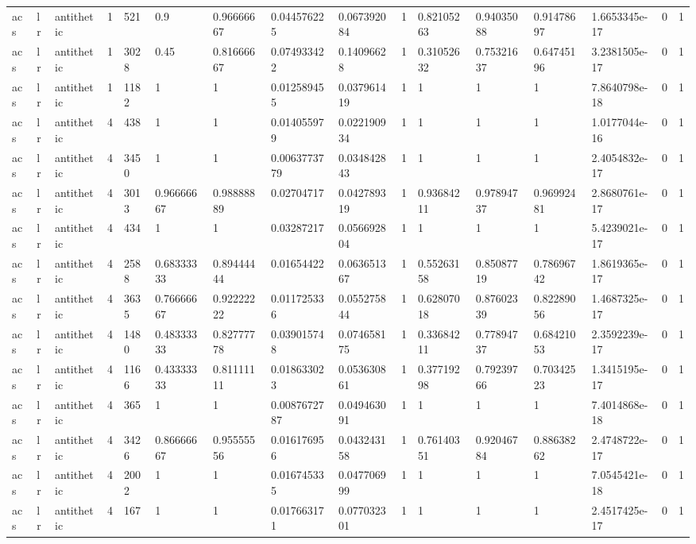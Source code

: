 \begin{tabular}{llllllllllllllll}
acs & lr & antithetic & 1 & 521 & 0.9 & 0.96666667 & 0.044576225 & 0.067392084 & 1 & 0.82105263 & 0.94035088 & 0.91478697 & 1.6653345e-17 & 0 & 1 \\
acs & lr & antithetic & 1 & 3028 & 0.45 & 0.81666667 & 0.074933422 & 0.14096628 & 1 & 0.31052632 & 0.75321637 & 0.64745196 & 3.2381505e-17 & 0 & 1 \\
acs & lr & antithetic & 1 & 1182 & 1 & 1 & 0.012589455 & 0.037961419 & 1 & 1 & 1 & 1 & 7.8640798e-18 & 0 & 1 \\
acs & lr & antithetic & 4 & 438 & 1 & 1 & 0.014055979 & 0.022190934 & 1 & 1 & 1 & 1 & 1.0177044e-16 & 0 & 1 \\
acs & lr & antithetic & 4 & 3450 & 1 & 1 & 0.0063773779 & 0.034842843 & 1 & 1 & 1 & 1 & 2.4054832e-17 & 0 & 1 \\
acs & lr & antithetic & 4 & 3013 & 0.96666667 & 0.98888889 & 0.02704717 & 0.042789319 & 1 & 0.93684211 & 0.97894737 & 0.96992481 & 2.8680761e-17 & 0 & 1 \\
acs & lr & antithetic & 4 & 434 & 1 & 1 & 0.03287217 & 0.056692804 & 1 & 1 & 1 & 1 & 5.4239021e-17 & 0 & 1 \\
acs & lr & antithetic & 4 & 2588 & 0.68333333 & 0.89444444 & 0.01654422 & 0.063651367 & 1 & 0.55263158 & 0.85087719 & 0.78696742 & 1.8619365e-17 & 0 & 1 \\
acs & lr & antithetic & 4 & 3635 & 0.76666667 & 0.92222222 & 0.011725336 & 0.055275844 & 1 & 0.62807018 & 0.87602339 & 0.82289056 & 1.4687325e-17 & 0 & 1 \\
acs & lr & antithetic & 4 & 1480 & 0.48333333 & 0.82777778 & 0.039015748 & 0.074658175 & 1 & 0.33684211 & 0.77894737 & 0.68421053 & 2.3592239e-17 & 0 & 1 \\
acs & lr & antithetic & 4 & 1166 & 0.43333333 & 0.81111111 & 0.018633023 & 0.053630861 & 1 & 0.37719298 & 0.79239766 & 0.70342523 & 1.3415195e-17 & 0 & 1 \\
acs & lr & antithetic & 4 & 365 & 1 & 1 & 0.0087672787 & 0.049463091 & 1 & 1 & 1 & 1 & 7.4014868e-18 & 0 & 1 \\
acs & lr & antithetic & 4 & 3426 & 0.86666667 & 0.95555556 & 0.016176956 & 0.043243158 & 1 & 0.76140351 & 0.92046784 & 0.88638262 & 2.4748722e-17 & 0 & 1 \\
acs & lr & antithetic & 4 & 2002 & 1 & 1 & 0.016745335 & 0.047706999 & 1 & 1 & 1 & 1 & 7.0545421e-18 & 0 & 1 \\
acs & lr & antithetic & 4 & 167 & 1 & 1 & 0.017663171 & 0.077032301 & 1 & 1 & 1 & 1 & 2.4517425e-17 & 0 & 1 \\

\end{tabular}
